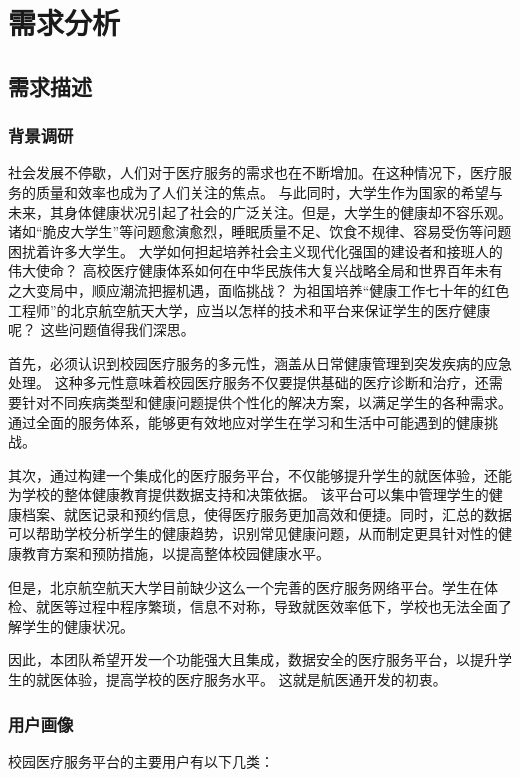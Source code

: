 \documentclass{article}
\begin{document}
\newpage

\tableofcontents

\newpage

\section{需求分析}
\subsection{需求描述}
\subsubsection{背景调研}

社会发展不停歇，人们对于医疗服务的需求也在不断增加。在这种情况下，医疗服务的质量和效率也成为了人们关注的焦点。
与此同时，大学生作为国家的希望与未来，其身体健康状况引起了社会的广泛关注。但是，大学生的健康却不容乐观。诸如“脆皮大学生”等问题愈演愈烈，睡眠质量不足、饮食不规律、容易受伤等问题困扰着许多大学生。
大学如何担起培养社会主义现代化强国的建设者和接班人的伟大使命？
高校医疗健康体系如何在中华民族伟大复兴战略全局和世界百年未有之大变局中，顺应潮流把握机遇，面临挑战？
为祖国培养“健康工作七十年的红色工程师”的北京航空航天大学，应当以怎样的技术和平台来保证学生的医疗健康呢？
这些问题值得我们深思。

首先，必须认识到校园医疗服务的多元性，涵盖从日常健康管理到突发疾病的应急处理。
这种多元性意味着校园医疗服务不仅要提供基础的医疗诊断和治疗，还需要针对不同疾病类型和健康问题提供个性化的解决方案，以满足学生的各种需求。通过全面的服务体系，能够更有效地应对学生在学习和生活中可能遇到的健康挑战。

其次，通过构建一个集成化的医疗服务平台，不仅能够提升学生的就医体验，还能为学校的整体健康教育提供数据支持和决策依据。
该平台可以集中管理学生的健康档案、就医记录和预约信息，使得医疗服务更加高效和便捷。同时，汇总的数据可以帮助学校分析学生的健康趋势，识别常见健康问题，从而制定更具针对性的健康教育方案和预防措施，以提高整体校园健康水平。

但是，北京航空航天大学目前缺少这么一个完善的医疗服务网络平台。学生在体检、就医等过程中程序繁琐，信息不对称，导致就医效率低下，学校也无法全面了解学生的健康状况。

因此，本团队希望开发一个功能强大且集成，数据安全的医疗服务平台，以提升学生的就医体验，提高学校的医疗服务水平。
这就是航医通开发的初衷。

\subsubsection{用户画像}
校园医疗服务平台的主要用户有以下几类：
\end{document}

